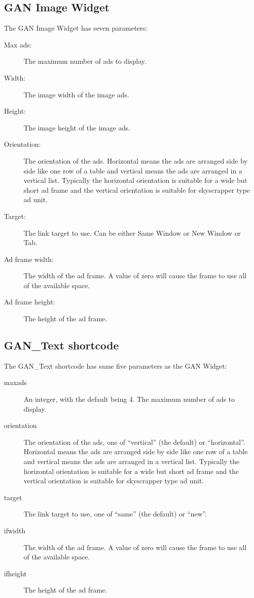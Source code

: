 \documentclass[letterpaper]{article}
\begin{document}
\subsection{GAN Image Widget}

The GAN Image Widget has seven parameters:
\begin{description}
  \item[Max ads:] The maximum number of ads to display.
  \item[Width:] The image width of the image ads.
  \item[Height:] The image height of the image ads.
  \item[Orientation:] The orientation of the ads. Horizontal
means the ads are arranged side by side like one row of a table and
vertical means the ads are arranged in a vertical list. Typically the
horizontal orientation is suitable for a wide but short ad frame and the
vertical orientation is suitable for skyscrapper type ad unit.
  \item[Target:] The link target to use. Can be either Same 
Window or New Window or Tab.
  \item[Ad frame width:] The width of the ad frame. A value
of zero will cause the frame to use all of the available space.
  \item[Ad frame height:] The height of the ad frame.
\end{description}

\subsection{GAN\_Text shortcode}

The GAN\_Text shortcode has same five parameters as the GAN
Widget:
\begin{description}
  \item[maxads] An integer, with the default being 4.
The maximum number of ads to display.
  \item[orientation] The orientation of the ads, one of
``vertical'' (the default) or ``horizontal''. Horizontal means the ads are
arranged side by side like one row of a table and      vertical means
the ads are arranged in a vertical list. Typically the horizontal
orientation is suitable for a wide but short ad frame and the vertical
orientation is suitable for skyscrapper type ad unit.
  \item[target] The link target to use, one of ``same'' (the
default) or ``new''.
  \item[ifwidth] The width of the ad frame. A value
of zero will cause the frame to use all of the available space.
  \item[ifheight] The height of the ad frame.
\end{description}
\end{document}
